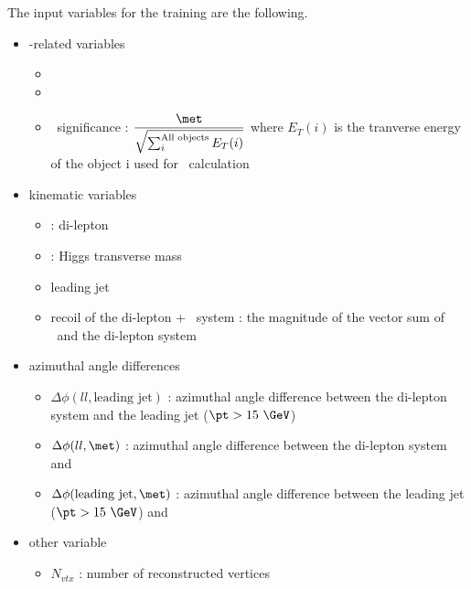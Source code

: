 The input variables for the training are the following. 
\begin{itemize}

%
\item \met-related variables
\begin{itemize}
\item \pmet 
\item \ptrkmet  
\item \met\ significance : 
      $\displaystyle \frac{\met}{\sqrt{\sum_{i}^{\textrm{All objects}} E_T(i)}}$
      where $E_T(i)$ is the tranverse energy of the object i used for \met\ calculation
\end{itemize}

%
\item kinematic variables
\begin{itemize}
\item \ptll : di-lepton \pt 
\item \mT : Higgs transverse mass 
\item leading jet \pt
\item recoil of the di-lepton + \met\ system :     
      the magnitude of the vector sum of \pfmet\ and the di-lepton system 
\end{itemize}

%
\item azimuthal angle differences 
\begin{itemize}
\item $\Delta\phi(ll, \textrm{leading jet})$ : azimuthal angle difference between 
      the di-lepton system and the leading jet ($\pt>15~\GeV$)
\item $\Delta\phi(ll, \met)$ : azimuthal angle difference between the di-lepton system 
      and \met
\item $\Delta\phi(\textrm{leading jet}, \met)$ : azimuthal angle difference between 
      the leading jet ($\pt>15~\GeV$) and \met
\end{itemize}

%
\item other variable
\begin{itemize}
\item $N_{vtx}$ : number of reconstructed vertices 
\end{itemize}

\end{itemize}

